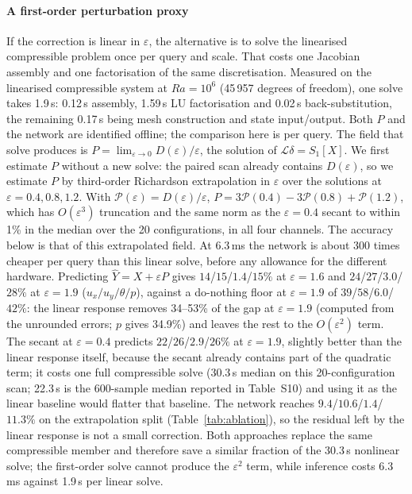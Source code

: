 \documentclass[preprint,11pt,a4paper,times,doubleblind]{elsarticle}
\begin{document}
\paragraph{A first-order perturbation proxy} If the correction is linear in $\varepsilon$, the
alternative is to solve the linearised compressible problem once per query and scale. That costs
one Jacobian assembly and one factorisation of the same discretisation. Measured on the linearised
compressible system at $Ra=10^6$ (45\,957 degrees of freedom), one solve takes 1.9\,s: 0.12\,s
assembly, 1.59\,s LU factorisation and 0.02\,s back-substitution, the remaining 0.17\,s being mesh
construction and state input/output. Both $P$ and the network are identified
offline; the comparison here is per query. The field that solve produces is
$P=\lim_{\varepsilon\to0}D(\varepsilon)/\varepsilon$, the solution of $\mathcal{L}\delta=S_1[X]$.
We first estimate $P$ without a new solve: the paired scan already contains
$D(\varepsilon)$, so we estimate $P$ by third-order Richardson extrapolation in $\varepsilon$
over the solutions at $\varepsilon=0.4,0.8,1.2$. With $\mathcal{P}(\varepsilon)=D(\varepsilon)/\varepsilon$,
$P=3\mathcal{P}(0.4)-3\mathcal{P}(0.8)+\mathcal{P}(1.2)$, which has $O(\varepsilon^3)$ truncation and the same norm as the
$\varepsilon=0.4$ secant to within 1\% in the median over the 20 configurations, in all four
channels. The accuracy below is that of this extrapolated field. At 6.3\,ms the network is about
300 times cheaper per query than this linear solve, before any allowance for the different hardware.
Predicting $\hat Y=X+\varepsilon P$ gives
$14$/$15$/$1.4$/$15\%$ at $\varepsilon=1.6$ and $24$/$27$/$3.0$/$28\%$ at $\varepsilon=1.9$
($u_x/u_y/\theta/p$), against a do-nothing floor at $\varepsilon=1.9$ of $39$/$58$/$6.0$/$42\%$: the linear response
removes 34--53\% of the gap at $\varepsilon=1.9$ (computed from the unrounded errors; $p$ gives
34.9\%) and leaves the rest to the $O(\varepsilon^2)$ term.
The secant at $\varepsilon=0.4$ predicts $22$/$26$/$2.9$/$26\%$ at $\varepsilon=1.9$, slightly
better than the linear response itself, because the secant already contains part of the quadratic
term; it costs one full compressible solve (30.3\,s median on this 20-configuration scan; 22.3\,s
is the 600-sample median reported in Table~S10) and using it as the linear baseline would
flatter that baseline. The network reaches
$9.4$/$10.6$/$1.4$/$11.3\%$ on the extrapolation split (Table~\ref{tab:ablation}), so the residual
left by the linear response is not a small correction. Both approaches replace the same compressible
member and therefore save a similar fraction of the 30.3\,s nonlinear solve; the first-order solve
cannot produce the $\varepsilon^2$ term, while inference costs 6.3\,ms against 1.9\,s per linear
solve.
\end{document}

